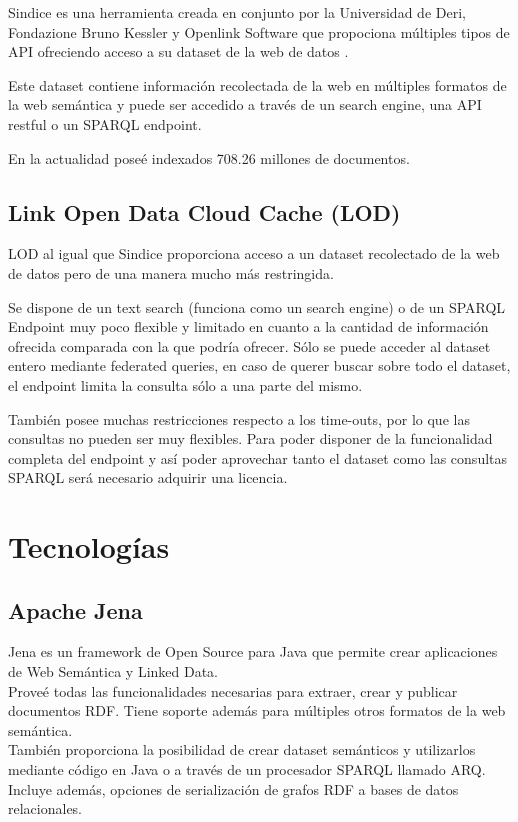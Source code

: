 Sindice es una herramienta creada en conjunto por la Universidad de Deri,  Fondazione Bruno Kessler y Openlink Software que propociona 
múltiples tipos de API ofreciendo acceso a su dataset de la web de datos \cite{Oren2008}. 

Este dataset contiene información recolectada de la web en múltiples formatos de la web semántica y puede ser accedido a través 
de un search engine, una API restful o un SPARQL endpoint. 

En la actualidad poseé indexados 708.26 millones de documentos.

\subsection{Link Open Data Cloud Cache (LOD)} 

LOD al igual que Sindice proporciona acceso a un dataset recolectado de la web de datos pero de una manera mucho más restringida. 

Se dispone de un text search (funciona como un search engine) o de un SPARQL Endpoint muy poco flexible y limitado en cuanto a 
la cantidad de información ofrecida comparada con la que podría ofrecer. Sólo se puede acceder al dataset entero mediante federated
queries, en caso de querer buscar sobre todo el dataset, el endpoint limita la consulta sólo a una parte del mismo. 

También posee muchas restricciones respecto a los time-outs, por lo que las consultas no pueden ser muy flexibles.
Para poder disponer de la funcionalidad completa del endpoint y así poder aprovechar tanto el dataset como las consultas SPARQL 
será necesario adquirir una licencia.


\section{Tecnologías}

\subsection{Apache Jena}

Jena es un framework de Open Source para Java que permite crear aplicaciones de Web Semántica y Linked Data. \\
Proveé todas las funcionalidades necesarias para extraer, crear y publicar documentos RDF. Tiene soporte además para múltiples otros 
formatos de la web semántica. \\
También proporciona la posibilidad de crear dataset semánticos y utilizarlos mediante código en Java o a través de un procesador SPARQL 
llamado ARQ.\\
Incluye además, opciones de serialización de grafos RDF a bases de datos relacionales.


